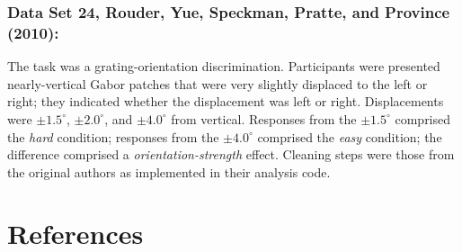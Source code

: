 \documentclass[
  ,man]{apa6}
\begin{document}
\hypertarget{data-set-24-rouder.etal.2010b}{%
\subsubsection{Data Set 24, Rouder, Yue, Speckman, Pratte, and Province (2010):}\label{data-set-24-rouder.etal.2010b}}

The task was a grating-orientation discrimination. Participants were presented nearly-vertical Gabor patches that were very slightly displaced to the left or right; they indicated whether the displacement was left or right. Displacements were \(\pm1.5^\circ\), \(\pm2.0^\circ\), and \(\pm4.0^\circ\) from vertical. Responses from the \(\pm1.5^\circ\) comprised the \emph{hard} condition; responses from the \(\pm4.0^\circ\) comprised the \emph{easy} condition; the difference comprised a \emph{orientation-strength} effect. Cleaning steps were those from the original authors as implemented in their analysis code.

\newpage

\hypertarget{references}{%
\section*{References}\label{references}}
\end{document}
